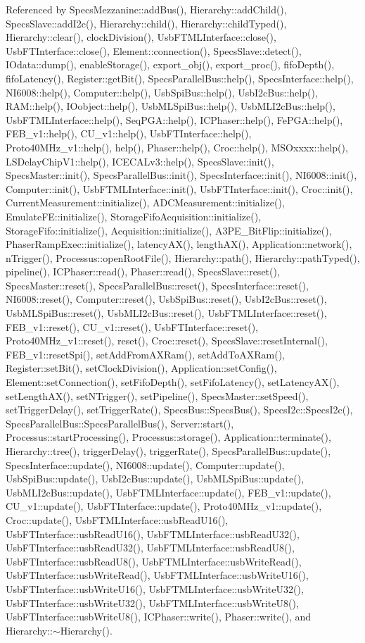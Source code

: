 Referenced by SpecsMezzanine::addBus(), Hierarchy::addChild(), SpecsSlave::addI2c(), Hierarchy::child(), Hierarchy::childTyped(), Hierarchy::clear(), clockDivision(), UsbFTMLInterface::close(), UsbFTInterface::close(), Element::connection(), SpecsSlave::detect(), IOdata::dump(), enableStorage(), export\_\-obj(), export\_\-proc(), fifoDepth(), fifoLatency(), Register::getBit(), SpecsParallelBus::help(), SpecsInterface::help(), NI6008::help(), Computer::help(), UsbSpiBus::help(), UsbI2cBus::help(), RAM::help(), IOobject::help(), UsbMLSpiBus::help(), UsbMLI2cBus::help(), UsbFTMLInterface::help(), SeqPGA::help(), ICPhaser::help(), FePGA::help(), FEB\_\-v1::help(), CU\_\-v1::help(), UsbFTInterface::help(), Proto40MHz\_\-v1::help(), help(), Phaser::help(), Croc::help(), MSOxxxx::help(), LSDelayChipV1::help(), ICECALv3::help(), SpecsSlave::init(), SpecsMaster::init(), SpecsParallelBus::init(), SpecsInterface::init(), NI6008::init(), Computer::init(), UsbFTMLInterface::init(), UsbFTInterface::init(), Croc::init(), CurrentMeasurement::initialize(), ADCMeasurement::initialize(), EmulateFE::initialize(), StorageFifoAcquisition::initialize(), StorageFifo::initialize(), Acquisition::initialize(), A3PE\_\-BitFlip::initialize(), PhaserRampExec::initialize(), latencyAX(), lengthAX(), Application::network(), nTrigger(), Processus::openRootFile(), Hierarchy::path(), Hierarchy::pathTyped(), pipeline(), ICPhaser::read(), Phaser::read(), SpecsSlave::reset(), SpecsMaster::reset(), SpecsParallelBus::reset(), SpecsInterface::reset(), NI6008::reset(), Computer::reset(), UsbSpiBus::reset(), UsbI2cBus::reset(), UsbMLSpiBus::reset(), UsbMLI2cBus::reset(), UsbFTMLInterface::reset(), FEB\_\-v1::reset(), CU\_\-v1::reset(), UsbFTInterface::reset(), Proto40MHz\_\-v1::reset(), reset(), Croc::reset(), SpecsSlave::resetInternal(), FEB\_\-v1::resetSpi(), setAddFromAXRam(), setAddToAXRam(), Register::setBit(), setClockDivision(), Application::setConfig(), Element::setConnection(), setFifoDepth(), setFifoLatency(), setLatencyAX(), setLengthAX(), setNTrigger(), setPipeline(), SpecsMaster::setSpeed(), setTriggerDelay(), setTriggerRate(), SpecsBus::SpecsBus(), SpecsI2c::SpecsI2c(), SpecsParallelBus::SpecsParallelBus(), Server::start(), Processus::startProcessing(), Processus::storage(), Application::terminate(), Hierarchy::tree(), triggerDelay(), triggerRate(), SpecsParallelBus::update(), SpecsInterface::update(), NI6008::update(), Computer::update(), UsbSpiBus::update(), UsbI2cBus::update(), UsbMLSpiBus::update(), UsbMLI2cBus::update(), UsbFTMLInterface::update(), FEB\_\-v1::update(), CU\_\-v1::update(), UsbFTInterface::update(), Proto40MHz\_\-v1::update(), Croc::update(), UsbFTMLInterface::usbReadU16(), UsbFTInterface::usbReadU16(), UsbFTMLInterface::usbReadU32(), UsbFTInterface::usbReadU32(), UsbFTMLInterface::usbReadU8(), UsbFTInterface::usbReadU8(), UsbFTMLInterface::usbWriteRead(), UsbFTInterface::usbWriteRead(), UsbFTMLInterface::usbWriteU16(), UsbFTInterface::usbWriteU16(), UsbFTMLInterface::usbWriteU32(), UsbFTInterface::usbWriteU32(), UsbFTMLInterface::usbWriteU8(), UsbFTInterface::usbWriteU8(), ICPhaser::write(), Phaser::write(), and Hierarchy::$\sim$Hierarchy().


